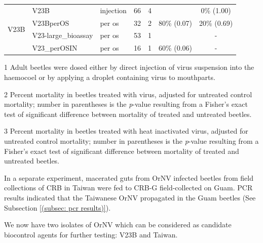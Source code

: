 \documentclass[12pt,
letterpaper,english,bibliography=totocnumbered, abstract=on]{scrartcl}
\begin{document}
\begin{table}[h]
\begin{adjustbox}{width=\columnwidth,center}
\begin{threeparttable}
\begin{tabular}{ l l l c c c c }
				\multirow{4}{*}{V23B} & V23B \parencite{moore_bioassay_2019-3}                & injection       & 66      & 4          & \cellcolor{yellow}{88\% (0.00)} & \hphantom{0}0\% (1.00)          \\
				& V23BperOS \parencite{moore_bioassay_2019-5}           & per os          & 32      & 2          & 80\% (0.07)                     & 20\% (0.69)                     \\
				& V23-large\_bioassay \parencite{moore_bioassay_2019-4} & per os          & 53      & 1          & \cellcolor{yellow}{42\% (0.00)} & -                               \\
				& V23\_perOSIN \parencite{moore_bioassay_2019-1}        & per os          & 16      & 1          & 60\% (0.06)                     & -                               \\ \bottomrule
			\end{tabular}
			\begin{tablenotes}[para]
				\item[1] Adult beetles were dosed either by direct injection of virus suspension into the haemocoel or by applying a droplet containing virus to mouthparts. \\ 
				\item[2] Percent mortality in beetles treated with virus, adjusted for untreated control mortality; 
				number in parentheses is the \textit{p}-value resulting from a Fisher's exact test of significant difference between mortality of treated and untreated beetles. \\
				\item[3] Percent mortality in beetles treated with heat inactivated virus, adjusted for untreated control mortality; 
				number in parentheses is the \textit{p}-value resulting from a Fisher's exact test of significant difference between mortality of treated and untreated beetles. 
			\end{tablenotes}
			
		\end{threeparttable}
	\end{adjustbox}
\end{table}

In a separate experiment, macerated guts from OrNV infected beetles from field collections of CRB in Taiwan were fed to CRB-G field-collected on Guam. PCR results indicated that the Taiwanese OrNV propagated in the Guam beetles (See Subsection \ref{(subsec: pcr results)}).

We now have two isolates of OrNV which can be considered as candidate biocontrol agents for further testing: V23B and Taiwan. 
\end{document}
